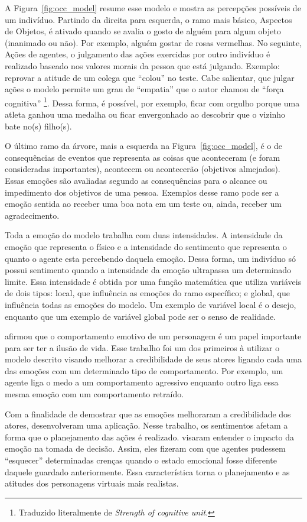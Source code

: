 A Figura~\ref{fig:occ_model} resume esse modelo e mostra as
percepções possíveis de um indivíduo.  Partindo da direita para esquerda, o
ramo mais básico, Aspectos de Objetos, é ativado quando se avalia o gosto de
alguém para algum objeto (inanimado ou não). Por exemplo, alguém gostar de
rosas vermelhas.  No seguinte, Ações de agentes, o julgamento das ações
exercidas por outro indivíduo é realizado baseado nos valores morais da pessoa
que está julgando. Exemplo: reprovar a atitude de um colega que ``colou'' no
teste. Cabe salientar, que julgar ações o modelo permite um grau de
``empatia'' que o autor chamou de ``força cognitiva'' \footnote{Traduzido
literalmente de \emph{Strength of cognitive unit}.}. Dessa forma, é possível,
por exemplo, ficar com orgulho porque uma atleta ganhou uma medalha ou ficar
envergonhado ao descobrir que o vizinho bate no(s) filho(s).

O último ramo da árvore, mais a esquerda na Figura~\ref{fig:occ_model}, é o de consequências de
eventos que representa as coisas que aconteceram (e foram consideradas
importantes), acontecem ou acontecerão (objetivos almejados)\dev{}. Essas
emoções são avaliadas segundo as consequências para o alcance ou impedimento
dos objetivos de uma pessoa. Exemplos desse ramo pode ser a emoção sentida
ao receber uma boa nota em um teste ou, ainda, receber um agradecimento.

Toda a emoção do modelo trabalha com duas intensidades. A intensidade da
emoção que representa o físico e a intensidade do sentimento que representa o
quanto o agente esta percebendo daquela emoção. Dessa forma, um indivíduo só
possui sentimento quando a intensidade da emoção ultrapassa um
determinado\dev{}
limite.  Essa intensidade é obtida por uma função matemática que utiliza
variáveis de dois tipos: local, que influência as emoções do ramo específico;
e global, que influência todas as emoções do modelo.  Um exemplo de variável
local é o desejo, enquanto que um exemplo de variável global pode ser o senso
de realidade.

\citet{bates1994role} afirmou que o comportamento emotivo de um personagem é
um papel importante para ser ter a ilusão de vida. Esse trabalho foi um dos
primeiros à utilizar o modelo descrito visando melhorar a credibilidade de
seus atores ligando cada uma das emoções com um determinado tipo de
comportamento. Por exemplo, um agente liga o medo a um comportamento agressivo
enquanto outro liga essa mesma emoção com um comportamento retraído.

Com a finalidade de demostrar que as emoções melhoraram a credibilidade dos
atores, \citet{zhang2009emotional} desenvolveram uma aplicação. Nesse
trabalho, os sentimentos afetam a forma que o planejamento das ações é
realizado. \citet{neto2010construction} visaram entender o impacto da emoção
na tomada de decisão. Assim, eles fizeram com que agentes pudessem
``esquecer'' determinadas crenças quando o estado emocional fosse diferente
daquele guardado anteriormente. Essa característica torna o planejamento e as
atitudes dos personagens virtuais mais realistas.

